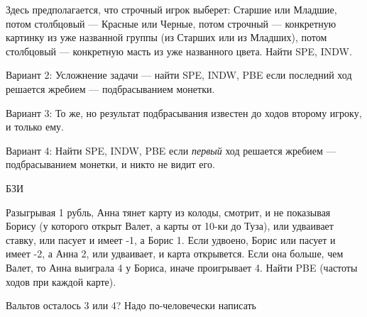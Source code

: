 \begin{problem}
Здесь предполагается, что строчный игрок выберет: Старшие
или Младшие, потом столбцовый — Красные или Черные, потом
строчный — конкретную картинку из уже названной группы (из
Старших или из Младших), потом столбцовый — конкретную
масть из уже названного цвета. Найти SPE, INDW.

Вариант 2: Усложнение задачи — найти SPE, INDW, PBE если
последний ход решается жребием — подбрасыванием монетки.

Вариант 3: То же, но результат подбрасывания известен до
ходов второму игроку, и только ему.

Вариант 4: Найти SPE, INDW, PBE если {\em первый} ход
решается жребием — подбрасыванием монетки, и никто не видит
его.






\begin{sol}

\end{sol}
\end{problem}




\begin{problem} 
\begin{source}
БЗИ
\end{source}
 Разыгрывая 1
рубль, Анна тянет карту из колоды, смотрит, и не показывая
Борису (у которого открыт Валет, а карты от 10-ки до Туза), или
удваивает ставку, или пасует и имеет -1, а Борис 1. Если
удвоено, Борис или пасует и имеет -2, а Анна 2, или удваивает, и
карта открывется. Если она больше, чем Валет, то Анна выиграла 4
у Бориса, иначе проигрывает 4. Найти PBE (частоты ходов при
каждой карте).

{\red Вальтов осталось 3 или 4? Надо по-человечески написать}

\begin{sol}
\end{sol}
\end{problem}




